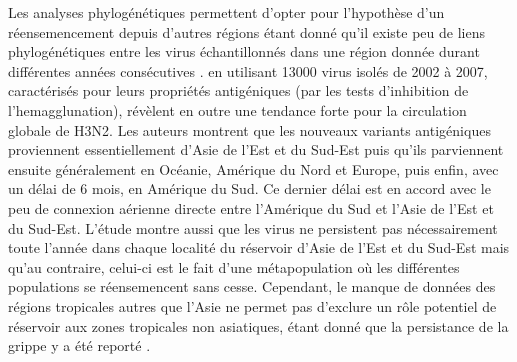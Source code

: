%


Les analyses phylogénétiques permettent d'opter pour l'hypothèse d'un
réensemencement depuis d'autres régions étant donné qu'il existe peu
de liens phylogénétiques entre les virus échantillonnés dans une
région donnée durant différentes années consécutives
\citep{Nelson2007b, Russell2008, Rambaut2008}. \citet{Russell2008} en
utilisant 13000 virus isolés de 2002 à 2007, caractérisés pour leurs
propriétés antigéniques (par les tests d'inhibition de
l'hemagglunation), révèlent en outre une tendance forte pour la
circulation globale de H3N2. Les auteurs montrent que les nouveaux
variants antigéniques proviennent essentiellement d'Asie de l'Est et
du Sud-Est puis qu'ils parviennent ensuite généralement en Océanie,
Amérique du Nord et Europe, puis enfin, avec un délai de 6 mois, en
Amérique du Sud. Ce dernier délai est en accord avec le peu de
connexion aérienne directe entre l'Amérique du Sud et l'Asie de l'Est
et du Sud-Est. L'étude montre aussi que les virus ne persistent pas
nécessairement toute l'année dans chaque localité du réservoir d'Asie
de l'Est et du Sud-Est mais qu'au contraire, celui-ci est le fait
d'une métapopulation où les différentes populations se réensemencent
sans cesse. Cependant, le manque de données des régions tropicales
autres que l'Asie ne permet pas d'exclure un rôle potentiel de
réservoir aux zones tropicales non asiatiques, étant donné que la
persistance de la grippe y a été reporté \citep{Viboud2006,
  Finkelman2007, Alonso2007a}.

